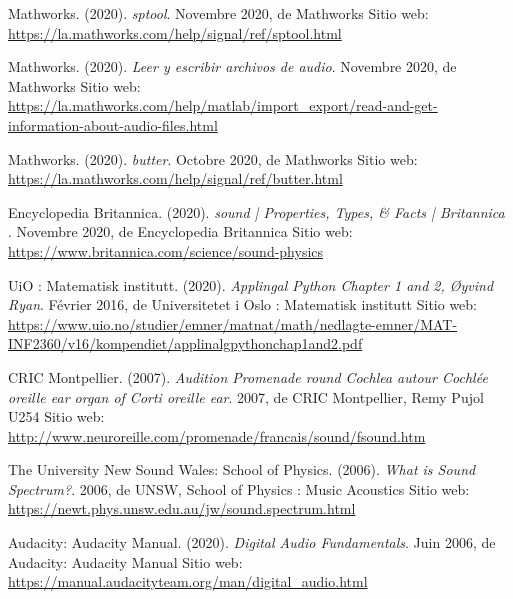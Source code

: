 \documentclass[conference,onecolumn]{IEEEtran}
\begin{document}
\begin{flushleft}
\begin{thebibliography}{100}
Mathworks. (2020).
\textit{sptool}. Novembre 2020, de Mathworks Sitio web: \href{https://la.mathworks.com/help/signal/ref/sptool.html}{https://la.mathworks.com/help/signal/ref/sptool.html}

Mathworks. (2020).
\textit{Leer y escribir archivos de audio}. Novembre 2020, de Mathworks Sitio web: \href{https://la.mathworks.com/help/matlab/import_export/read-and-get-information-about-audio-files.html}{https://la.mathworks.com/help/matlab/import\_export/read-and-get-information-about-audio-files.html}

Mathworks. (2020). \textit{butter}. Octobre 2020, de Mathworks Sitio web: \href{https://la.mathworks.com/help/signal/ref/butter.html}{https://la.mathworks.com/help/signal/ref/butter.html}

Encyclopedia Britannica. (2020). \textit{sound | Properties, Types, \& Facts | Britannica }. Novembre 2020, de Encyclopedia Britannica Sitio web: \href{https://www.britannica.com/science/sound-physics}{https://www.britannica.com/science/sound-physics}

UiO : Matematisk institutt. (2020). \textit{Applingal Python Chapter 1 and 2, Øyvind Ryan}. Février 2016, de Universitetet i Oslo : Matematisk institutt  Sitio web: \href{https://www.uio.no/studier/emner/matnat/math/nedlagte-emner/MAT-INF2360/v16/kompendiet/applinalgpythonchap1and2.pdf}{https://www.uio.no/studier/emner/matnat/math/nedlagte-emner/MAT-INF2360/v16/kompendiet/applinalgpythonchap1and2.pdf}

CRIC Montpellier. (2007). \textit{Audition  Promenade round Cochlea autour Cochlée oreille ear organ of Corti oreille ear}. 2007, de CRIC Montpellier, Remy Pujol U254  Sitio web: \href{http://www.neuroreille.com/promenade/francais/sound/fsound.htm}{http://www.neuroreille.com/promenade/francais/sound/fsound.htm}

The University New Sound Wales: School of Physics. (2006). \textit{What is Sound Spectrum?}. 2006, de UNSW, School of Physics : Music Acoustics  Sitio web: \href{https://newt.phys.unsw.edu.au/jw/sound.spectrum.html}{https://newt.phys.unsw.edu.au/jw/sound.spectrum.html}

Audacity: Audacity Manual. (2020). \textit{Digital Audio Fundamentals}. Juin 2006, de Audacity: Audacity Manual  Sitio web: \href{https://manual.audacityteam.org/man/digital_audio.html}{https://manual.audacityteam.org/man/digital\_audio.html}


\end{thebibliography}
\end{flushleft}
\end{document}
